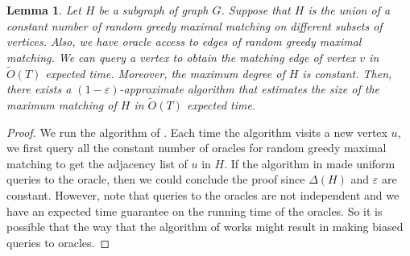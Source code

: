 \documentclass[letterpaper,11pt]{article}
\renewcommand{\epsilon}{\varepsilon}
\newcommand{\wt}[1]{\ensuremath{\widetilde{#1}}}
\newtheorem{lemma}{Lemma}[section]
\begin{document}
\begin{lemma}\label{lem:matching-sparse-levi}
    Let $H$ be a subgraph of graph $G$. Suppose that $H$ is the union of a constant number of random greedy maximal matching on different subsets of vertices. Also, we have oracle access to edges of random greedy maximal matching. We can query a vertex to obtain the matching edge of vertex $v$ in $\wt{O}(T)$ expected time.  Moreover, the maximum degree of $H$ is constant. Then, there exists a $(1-\epsilon)$-approximate algorithm that estimates the size of the maximum matching of $H$ in $\wt{O}(T)$ expected time.
\end{lemma}
\begin{proof}
    We run the algorithm of . Each time the algorithm visits a new vertex $u$, we first query all the constant number of oracles for random greedy maximal matching to get the adjacency list of $u$ in $H$. If the algorithm in  made uniform queries to the oracle, then we could conclude the proof since $\Delta(H)$ and $\epsilon$ are constant. However, note that queries to the oracles are not independent and we have an expected time guarantee on the running time of the oracles. So it is possible that the way that the algorithm of  works might result in making biased queries to oracles. 
    


\end{proof}
\end{document}
